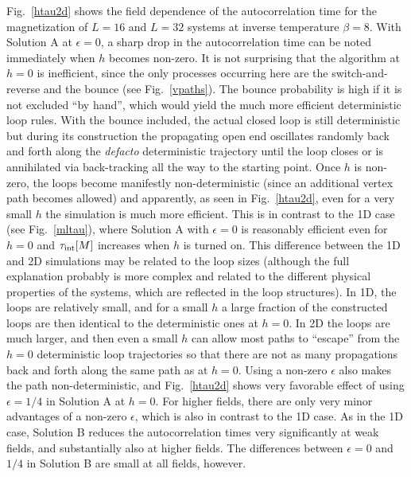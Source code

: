 \documentclass[10pt,pre,aps,twocolumn,showpacs,superscriptaddress,
floatfix]{revtex4}
\begin{document}
Fig.~\ref{htau2d} shows the field dependence of the autocorrelation time for 
the magnetization of $L=16$ and $L=32$ systems at inverse temperature 
$\beta=8$. With Solution A at $\epsilon=0$, a sharp drop in the 
autocorrelation time can be noted immediately when $h$ becomes non-zero. 
It is not surprising that the algorithm at $h=0$ is inefficient, since the 
only processes occurring here are the switch-and-reverse and the bounce 
(see Fig.~\ref{vpaths}). The bounce probability is high if it is not 
excluded ``by hand'', which would yield the much more efficient deterministic 
loop rules. With the bounce included, the actual closed loop is still 
deterministic but during its construction the propagating open end oscillates 
randomly back and forth along the {\it defacto} deterministic trajectory until
the loop closes or is annihilated via back-tracking all the way to the 
starting point. Once $h$ is non-zero, the loops become manifestly 
non-deterministic (since an additional vertex path becomes allowed)
and apparently, as seen in Fig.~\ref{htau2d}, even for a very small $h$ the 
simulation is much more efficient. This is in contrast to the 1D case (see 
Fig.~\ref{mltau}), where Solution A with $\epsilon=0$ is reasonably efficient 
even for $h=0$ and $\tau_{\rm int}[M]$ increases when $h$ is turned on. 
This difference between the 1D and 2D simulations may be related to the 
loop sizes (although the full explanation probably is more complex and
related to the different physical properties of the systems, which are
reflected in the loop structures). In 1D, the loops are relatively small, 
and for a small $h$ a large fraction of the constructed loops are then 
identical to the deterministic ones at $h=0$. In 2D the loops are much 
larger, and then even a small $h$ can allow most paths to ``escape'' from 
the $h=0$ deterministic loop trajectories so that there are not as many 
propagations back and forth along the same path as at $h=0$. Using a non-zero 
$\epsilon$ also makes the path non-deterministic, and Fig.~\ref{htau2d} shows 
very favorable effect of using $\epsilon=1/4$ in Solution A at $h=0$. For 
higher fields, there are only very minor advantages of a non-zero $\epsilon$, 
which is also in contrast to the 1D case. As in the 1D case, Solution B 
reduces the autocorrelation times very significantly at weak fields, and 
substantially also at higher fields. The differences between $\epsilon=0$ 
and $1/4$ in Solution B are small at all fields, however.
\end{document}
